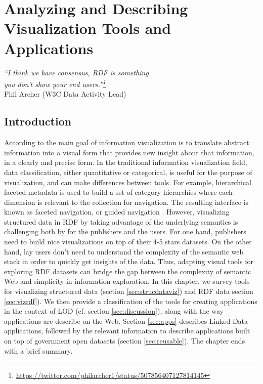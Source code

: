 \chapter{Analyzing and Describing Visualization Tools and Applications}
\label{ch:ch4}

\begin{flushright}
\textit{``I think we have consensus, RDF is something \\
you don't show your end users.''\footnote{\url{https://twitter.com/philarcher1/status/507856407127814145}}}  \\
Phil Archer (W3C Data Activity Lead)
\end{flushright}


\section*{Introduction}
\label{sec:intro-ch4}

According to \cite{marti2009} the main goal of information visualization is to translate abstract information into a visual form that provides new insight about that information, in a clearly and precise form. In the traditional information visualization field, data classification, either quantitative or categorical, is useful for the purpose of visualization, and can make differences between tools. For example, hierarchical faceted metadata is used to build a set of category hierarchies where each dimension is relevant to the collection for navigation. The resulting interface is known as faceted navigation, or guided navigation \cite{hearst02}. However, visualizing structured data in RDF by taking advantage of the underlying semantics is challenging both by for the publishers and the users. For one hand, publishers need to build nice visualizations on top of their 4-5 stars datasets. On the other hand, lay users don't need to understand the complexity of the semantic web stack in order to quickly get insights of the data. Thus, adapting visual tools for exploring RDF datasets can bridge the gap between the complexity of semantic Web and simplicity in information exploration. In this chapter, we survey tools for visualizing structured data (section \ref{sec:strucdataviz}) and RDF data section \ref{sec:vizrdf}). We then provide a classification of the tools for creating applications in the context of LOD (cf. section \ref{sec:discussion}), along with the way applications are describe on the Web. Section \ref{sec:apps} describes Linked Data applications, followed by the relevant information to describe applications built on top of government open datasets (section \ref{sec:reusable}). The chapter ends with a brief summary. 

